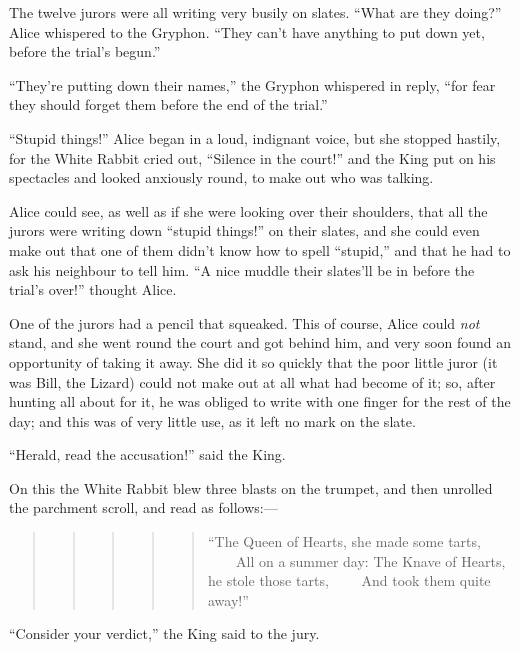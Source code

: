 \documentclass[11pt,openany,oneside]{book}
\begin{document}
The twelve jurors were all writing very busily on slates. “What are they doing?” Alice whispered to the Gryphon. “They can’t have anything to put down yet, before the trial’s begun.” 

“They’re putting down their names,” the Gryphon whispered in reply, “for fear they should forget them before the end of the trial.” 

“Stupid things!” Alice began in a loud, indignant voice, but she stopped hastily, for the White Rabbit cried out, “Silence in the court!” and the King put on his spectacles and looked anxiously round, to make out who was talking. 

Alice could see, as well as if she were looking over their shoulders, that all the jurors were writing down “stupid things!” on their slates, and she could even make out that one of them didn’t know how to spell “stupid,” and that he had to ask his neighbour to tell him. “A nice muddle their slates’ll be in before the trial’s over!” thought Alice. 

One of the jurors had a pencil that squeaked. This of course, Alice could {\em not\/} stand, and she went round the court and got behind him, and very soon found an opportunity of taking it away. She did it so quickly that the poor little juror (it was Bill, the Lizard) could not make out at all what had become of it; so, after hunting all about for it, he was obliged to write with one finger for the rest of the day; and this was of very little use, as it left no mark on the slate. 

“Herald, read the accusation!” said the King. 

On this the White Rabbit blew three blasts on the trumpet, and then unrolled the parchment scroll, and read as follows:— 

\begin{quote}
\begin{quote}
\begin{quote}
\begin{quote}
\begin{quote}
{\small “The Queen of Hearts, she made some tarts,}\newline
{\small  ~~~~All on a summer day:}\newline
{\small  The Knave of Hearts, he stole those tarts,}\newline
{\small  ~~~~And took them quite away!” }

\end{quote}
\end{quote}
\end{quote}
\end{quote}
\end{quote}
“Consider your verdict,” the King said to the jury. 
\end{document}
